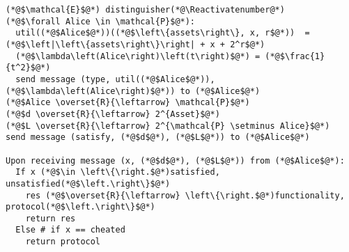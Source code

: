 \Suppressnumber
\begin{lstlisting}[label=distenv, style=numbers]
(*@$\mathcal{E}$@*) distinguisher(*@\Reactivatenumber@*)
(*@$\forall Alice \in \mathcal{P}$@*):
  util((*@$Alice$@*))((*@$\left\{assets\right\}, x, r$@*))  = (*@$\left|\left\{assets\right\}\right| + x + 2^r$@*)
  (*@$\lambda\left(Alice\right)\left(t\right)$@*) = (*@$\frac{1}{t^2}$@*)
  send message (type, util((*@$Alice$@*)), (*@$\lambda\left(Alice\right)$@*)) to (*@$Alice$@*)
(*@$Alice \overset{R}{\leftarrow} \mathcal{P}$@*)
(*@$d \overset{R}{\leftarrow} 2^{Asset}$@*)
(*@$L \overset{R}{\leftarrow} 2^{\mathcal{P} \setminus Alice}$@*)
send message (satisfy, (*@$d$@*), (*@$L$@*)) to (*@$Alice$@*)

Upon receiving message (x, (*@$d$@*), (*@$L$@*)) from (*@$Alice$@*):
  If x (*@$\in \left\{\right.$@*)satisfied, unsatisfied(*@$\left.\right\}$@*)
    res (*@$\overset{R}{\leftarrow} \left\{\right.$@*)functionality, protocol(*@$\left.\right\}$@*)
    return res
  Else # if x == cheated
    return protocol
\end{lstlisting}
